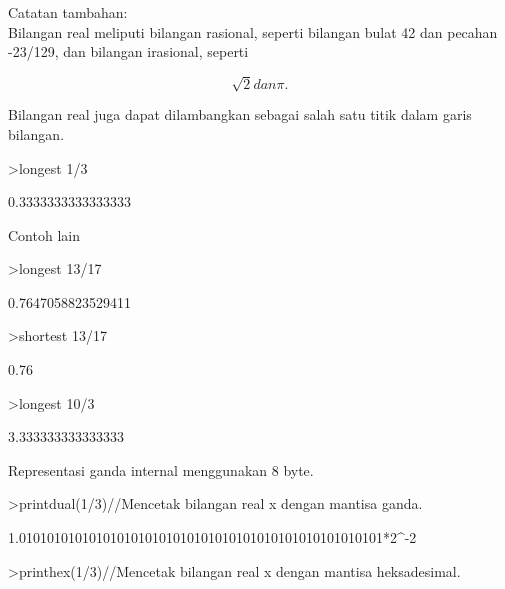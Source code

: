 \documentclass[a4paper,10pt]{article}
\begin{document}
\begin{eulernotebook}
\begin{eulercomment}
Catatan tambahan:\\
Bilangan real meliputi bilangan rasional, seperti bilangan bulat 42
dan pecahan -23/129, dan bilangan irasional, seperti\\
\end{eulercomment}
\begin{eulerformula}
\[
\sqrt2 dan \pi.
\]
\end{eulerformula}
\begin{eulercomment}
Bilangan real juga dapat dilambangkan sebagai salah satu titik dalam
garis bilangan.
\end{eulercomment}
\begin{eulerprompt}
>longest 1/3
\end{eulerprompt}
\begin{euleroutput}
       0.3333333333333333 
\end{euleroutput}
\begin{eulercomment}
Contoh lain
\end{eulercomment}
\begin{eulerprompt}
>longest 13/17
\end{eulerprompt}
\begin{euleroutput}
       0.7647058823529411 
\end{euleroutput}
\begin{eulerprompt}
>shortest 13/17
\end{eulerprompt}
\begin{euleroutput}
    0.76 
\end{euleroutput}
\begin{eulerprompt}
>longest 10/3
\end{eulerprompt}
\begin{euleroutput}
        3.333333333333333 
\end{euleroutput}
\begin{eulercomment}
Representasi ganda internal menggunakan 8 byte.
\end{eulercomment}
\begin{eulerprompt}
>printdual(1/3)//Mencetak bilangan real x dengan mantisa ganda.
\end{eulerprompt}
\begin{euleroutput}
  1.0101010101010101010101010101010101010101010101010101*2^-2
\end{euleroutput}
\begin{eulerprompt}
>printhex(1/3)//Mencetak bilangan real x dengan mantisa heksadesimal.
\end{eulerprompt}
\begin{euleroutput}

\end{euleroutput}
\end{eulernotebook}
\end{document}
